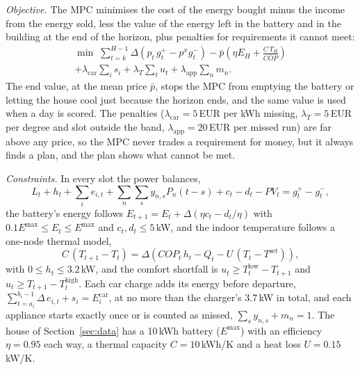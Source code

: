 \textit{Objective.} The MPC minimises the cost of the energy bought
minus the income from the energy sold, less the value of the energy left
in the battery and in the building at the end of the horizon, plus
penalties for requirements it cannot meet:
\begin{multline}
\min \; \sum_{t=k}^{H-1} \Delta \left(p_t\, g^{+}_t - p^{x} g^{-}_t\right)
 - \bar{p}\left(\eta E_H + \frac{C\, T_H}{\overline{\mathit{COP}}}\right) \\
 + \lambda_{\mathrm{car}} \sum_i s_i + \lambda_{T} \sum_t u_t
 + \lambda_{\mathrm{app}} \sum_n m_n .
\label{eq:mpcobj}
\end{multline}
The end value, at the mean price $\bar{p}$, stops the MPC from emptying
the battery or letting the house cool just because the horizon ends,
and the same value is used when a day is scored. The penalties
($\lambda_{\mathrm{car}} = 5$\,EUR per kWh missing, $\lambda_T = 5$\,EUR per
degree and slot outside the band, $\lambda_{\mathrm{app}} = 20$\,EUR per
missed run) are far above any price, so the MPC never trades a
requirement for money, but it always finds a plan, and the plan shows
what cannot be met.

\textit{Constraints.} In every slot the power balances,
\begin{equation}
L_t + h_t + \sum_i e_{i,t} + \sum_n \sum_s y_{n,s} P_n(t-s) + c_t - d_t
 - \mathit{PV}_t = g^{+}_t - g^{-}_t ,
\label{eq:mpcbalance}
\end{equation}
the battery's energy follows
$E_{t+1} = E_t + \Delta(\eta c_t - d_t/\eta)$ with
$0.1 E^{\max} \le E_t \le E^{\max}$ and $c_t, d_t \le 5$\,kW, and the
indoor temperature follows a one-node thermal model,
\begin{equation}
C\,(T_{t+1} - T_t) = \Delta\left(\mathit{COP}_t\, h_t - Q_t - U\,(T_t - T^{\mathrm{set}})\right),
\label{eq:mpcthermal}
\end{equation}
with $0 \le h_t \le 3.2$\,kW, and the comfort shortfall is
$u_t \ge T^{\mathrm{low}}_t - T_{t+1}$ and
$u_t \ge T_{t+1} - T^{\mathrm{high}}_t$. Each car charge adds its energy before
departure, $\sum_{t=a_i}^{b_i-1} \Delta\, e_{i,t} + s_i = E^{\mathrm{car}}_i$,
at no more than the charger's 3.7\,kW in total, and each appliance starts
exactly once or is counted as missed,
$\sum_s y_{n,s} + m_n = 1$. The house of Section~\ref{sec:data} has a
10\,kWh battery ($E^{\max}$) with an efficiency $\eta = 0.95$ each way, a
thermal capacity $C = 10$\,kWh/K and a heat loss $U = 0.15$\,kW/K.


